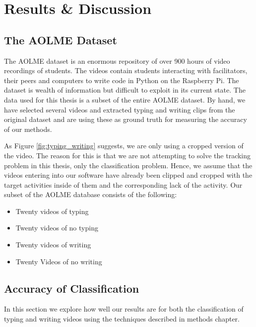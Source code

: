 \chapter{Results \& Discussion}
\section{\label{section:the_data}The AOLME Dataset}
The AOLME dataset is an enormous repository of over 900 hours of video
recordings of students. The videos contain students
interacting with facilitators, their peers and computers to write code in
Python on the Raspberry Pi.  The dataset is wealth of information but difficult
to exploit in its current state.  The data used for this thesis is a subset of
the entire AOLME dataset. By hand, we have selected several videos and extracted
typing and writing clips from the original dataset and are using these as ground
truth for measuring the accuracy of our methods.

As Figure \ref{fig:typing_writing} suggests, we are only using a cropped version
of the video. The reason for this is that we are not attempting to solve the tracking
problem in this thesis, only the classification problem. Hence, we assume that
the videos entering into our software have already been clipped and cropped with
the target activities inside of them and the corresponding lack of the activity.
Our subset of the AOLME database consists of the following:

\begin{itemize}
\item Twenty videos of typing
\item Twenty videos of no typing
\item Twenty videos of writing
\item Twenty Videos of no writing
\end{itemize}

\section{\label{section:accuracy} Accuracy of Classification}
In this section we explore how well our results are for both the classification
of typing and writing videos using the techniques described in methods chapter.

